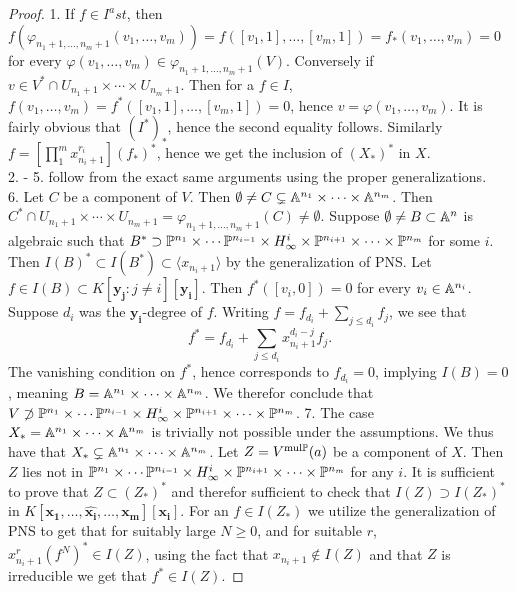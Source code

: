     \begin{proof}
        1. If $f\in I^ast$, then $f(\varphi_{n_1+1,\dots,n_m+1}(v_1,\dots,v_m))=f([v_1,1],\dots,[v_m,1])=f_\ast(v_1,\dots,v_m) = 0$ for every $\varphi(v_1,\dots,v_m)\in \varphi_{n_1+1,\dots,n_m+1}(V)$. Conversely if $v\in V^\ast \cap U_{n_1+1}\times\cdots\times U_{n_m+1}$. Then for a $f\in I$, $f(v_1,\dots,v_m)=f^\ast([v_1,1],\dots,[v_m,1])=0$, hence $v=\varphi(v_1,\dots,v_m).$ It is fairly obvious that $(I^\ast)_\ast$, hence the second equality follows. Similarly $f=\left[\prod_1^m x_{n_i+1}^{r_i}\right](f_\ast)^\ast$, hence we get the inclusion of $(X_\ast)^\ast$ in $X$.\\
        2. - 5. follow from the exact same arguments using the proper generalizations.\\
        6. Let $C$ be a component of $V$. Then $\emptyset \neq C\subsetneq \mathbb{A}^{n_1}\times \cdots \times \mathbb{A}^{n_m}$. Then $C^\ast \cap U_{n_1+1}\times\cdots\times U_{n_m+1} = \varphi_{n_1+1,\dots,n_m+1}(C)\neq \emptyset$. Suppose $\emptyset \neq B \subset \mathbb{A}^n$ is algebraic such that $B^\ast \supset \mathbb{P}^{n_1}\times\cdots\mathbb{P}^{n_{i-1}}\times H^i_\infty\times\mathbb{P}^{n_{i+1}}\times\cdots\times\mathbb{P}^{n_m}$ for some $i$. Then $I(B)^\ast\subset I(B^\ast) \subset \langle x_{n_i+1}\rangle$ by the generalization of PNS. Let $f\in I(B)\subset K[\mathbf{y_j}:j\neq i][\mathbf{y_i}]$. Then $f^\ast([v_i,0])=0$ for every $v_i\in \mathbb{A}^{n_i}$. Suppose $d_i$ was the $\mathbf{y_i}$-degree of $f$. Writing $f=f_{d_i}+\sum_{j\leq d_i} f_{j}$, we see that 
        $$f^\ast = f_{d_i}+\sum_{j\leq d_i}x_{n_i+1}^{d_i-j}f_{j}.$$
        The vanishing condition on $f^\ast$, hence corresponds to $f_{d_i}=0$, implying $I(B)=0$, meaning $B=\mathbb{A}^{n_1}\times \cdots\times \mathbb{A}^{n_m}$. We therefor conclude that $V\not\supset \mathbb{P}^{n_1}\times\cdots\mathbb{P}^{n_{i-1}}\times H^i_\infty\times\mathbb{P}^{n_{i+1}}\times\cdots\times\mathbb{P}^{n_m}$. 
        7. The case $X_\ast = \mathbb{A}^{n_1}\times\cdots\times \mathbb{A}^{n_m}$ is trivially not possible under the assumptions. We thus have that $X_\ast \subsetneq \mathbb{A}^{n_1}\times\cdots\times \mathbb{A}^{n_m}$. Let $Z=V^{\mathrm{mul}\mathbb{P}}(a)$ be a component of $X$. Then $Z$ lies not in $\mathbb{P}^{n_1}\times\cdots\mathbb{P}^{n_{i-1}}\times H^i_\infty\times\mathbb{P}^{n_{i+1}}\times\cdots\times\mathbb{P}^{n_m}$ for any $i$. It is sufficient to prove that $Z\subset (Z_\ast)^\ast$ and therefor sufficient to check that $I(Z)\supset I(Z_\ast)^\ast$ in $K[\mathbf{x_1},\dots,\widehat{\mathbf{x_i}},\dots,\mathbf{x_m}][\mathbf{x_i}]$. For an $f\in I(Z_\ast)$ we utilize the generalization of PNS to get that for suitably large $N\geq 0$, and for suitable $r$, $x_{n_i+1}^{r}(f^N)^\ast \in I(Z)$, using the fact that $x_{n_i+1}\notin I(Z)$ and that $Z$ is irreducible we get that $f^\ast \in I(Z)$.
     \end{proof}    
